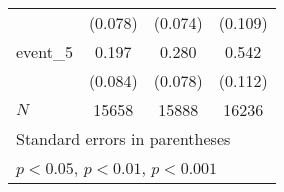 {\begin{tabular}{l*{3}{c}}
            &     (0.078)         &     (0.074)         &     (0.109)         \\
[1em]
event\_5     &       0.197\sym{*}  &       0.280\sym{***}&       0.542\sym{***}\\
            &     (0.084)         &     (0.078)         &     (0.112)         \\
\hline
\(N\)       &       15658         &       15888         &       16236         \\
\hline\hline
\multicolumn{4}{l}{\footnotesize Standard errors in parentheses}\\
\multicolumn{4}{l}{\footnotesize \sym{*} \(p<0.05\), \sym{**} \(p<0.01\), \sym{***} \(p<0.001\)}\\
\end{tabular}
}
